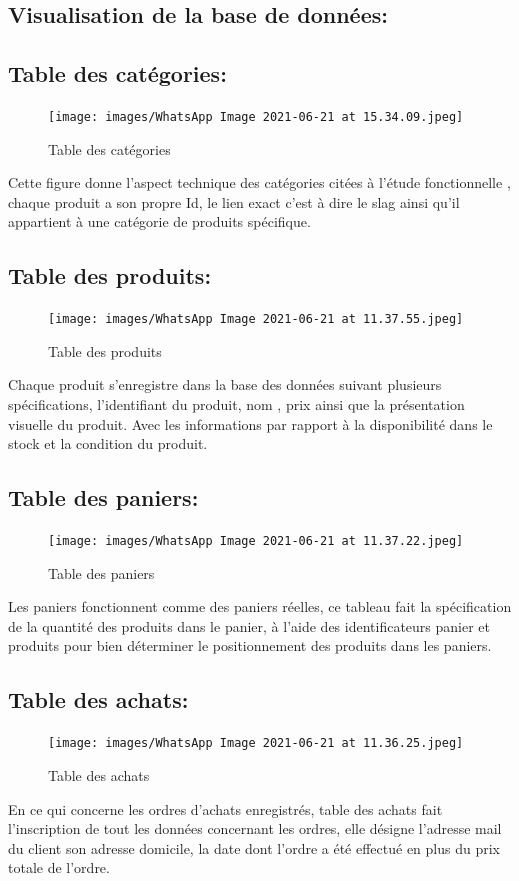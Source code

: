 \documentclass[a4paper,12pt]{report}
\begin{document}
\begin{doublespace}
\begin{doublespace}
\begin{doublespace}
\begin{doublespace}
\begin{doublespace}
\begin{doublespace}
\section{ Visualisation de la base de données:}
 \subsection{ Table des catégories: } 
\begin{figure}[H]
 \texttt{[image: images/WhatsApp Image 2021-06-21 at 15.34.09.jpeg]}
 \caption{Table des catégories}
\end{figure}
Cette figure donne l'aspect technique des catégories citées à l'étude 
fonctionnelle , chaque produit a son propre Id, le lien exact c'est à dire le slag ainsi qu'il appartient à une catégorie de produits spécifique. 
\subsection{ Table des produits: } 
\begin{figure}[H]

 \texttt{[image: images/WhatsApp Image 2021-06-21 at 11.37.55.jpeg]}
 \caption{Table des produits}
\end{figure}  
Chaque produit s'enregistre dans la base des données suivant plusieurs spécifications, l'identifiant du produit, nom , prix ainsi que la présentation visuelle du produit. Avec les informations par rapport à la disponibilité dans le stock et la condition du produit.
\subsection{ Table des paniers: } 
\begin{figure}[H]

 \texttt{[image: images/WhatsApp Image 2021-06-21 at 11.37.22.jpeg]}
 \caption{Table des paniers}
\end{figure}    
Les paniers fonctionnent comme des paniers réelles, ce tableau fait la spécification de la quantité des produits dans le panier,  à l'aide des identificateurs panier et produits pour bien déterminer le positionnement des produits dans les paniers.
 \subsection{ Table des achats: } 
\begin{figure}[H]

 \texttt{[image: images/WhatsApp Image 2021-06-21 at 11.36.25.jpeg]}
 \caption{Table des achats}
\end{figure} 
En ce qui concerne les ordres d'achats enregistrés, table  des achats fait l'inscription de tout les données concernant les ordres, elle désigne l'adresse mail du client son adresse domicile, la  date dont l'ordre a été effectué en plus du prix totale de l'ordre.

\end{doublespace}
\end{doublespace}
\end{doublespace}
\end{doublespace}
\end{doublespace}
\end{doublespace}
\end{document}
